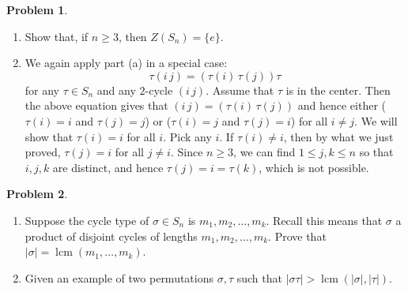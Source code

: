 \documentclass[11pt]{article}
\makeatletter
\renewenvironment{proof}[1][\proofname]{\par
  \vspace{-\topsep}%
  \pushQED{\qed}%
  \normalfont
  \topsep0pt \partopsep0pt %
  \trivlist
  \item[\hskip\labelsep
        \itshape
    #1\@addpunct{.}]\ignorespaces
}{%
  \popQED\endtrivlist\@endpefalse
  \addvspace{6pt plus 6pt} %
}
\DeclareMathOperator{\lcm}{lcm}
\theoremstyle{definition}
\newtheorem{problem}{Problem}
\makeatother
\begin{document}
\begin{problem}
\begin{enumerate}[label=(\alph*)]
\item Show that, if $n\geq 3$, then $Z(S_n) = \{e\}$.
\begin{proof}
We again apply part (a) in a special case:
 $$
  \tau (i \, j) = (\tau(i) \, \tau(j)) \tau
  $$
  for any $\tau \in S_n$ and any $2$-cycle $(i \, j)$. Assume that $\tau$ is in the center. Then the above equation gives that  
  $(i \, j) = (\tau(i) \, \tau(j))$  and hence either ($\tau(i) = i$ and $\tau(j) = j$) or ($\tau(i) = j$ and $\tau(j) = i$) for all $i \ne j$.
We will show that $\tau(i) = i$ for all $i$. Pick any $i$. If $\tau(i) \ne i$, then by what we just proved, $\tau(j)  = i$ for all $j \ne i$. 
Since $n \geq 3$, 
we can find $1 \leq j, k \leq n$ so that $i,j,k$ are distinct, and hence $\tau(j) = i = \tau(k)$, which is not possible.
\end{proof}

\end{enumerate}
\end{problem}


\begin{problem}
	\begin{enumerate}[label=(\alph*)]
\item Suppose the cycle type of $\sigma \in S_n$ is $m_1, m_2, \ldots, m_k$. Recall this means that $\sigma$ a product of disjoint cycles of lengths $m_1, m_2, \ldots, m_k$. Prove that $|\sigma| = \lcm(m_1, \ldots, m_k)$. 
\item Given an example of two permutations $\sigma, \tau$ such that $|\sigma\tau| > \lcm(|\sigma|,|\tau|)$.
\end{enumerate}
\end{problem}

\vspace{0.5em}
\end{document}
